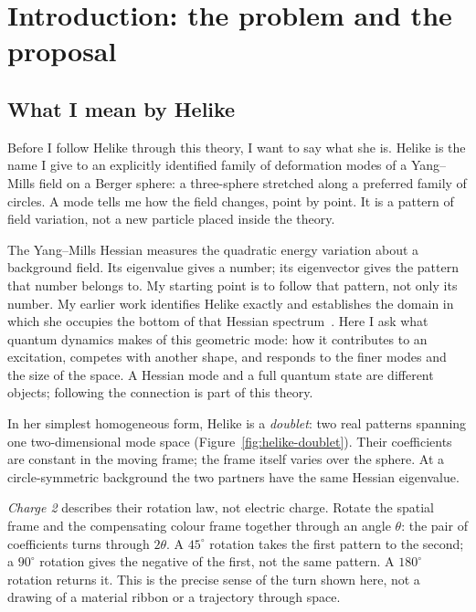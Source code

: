 \section{Introduction: the problem and the proposal}

\subsection*{What I mean by Helike}

Before I follow Helike through this theory, I want to say what she is. Helike is the name I give to an explicitly
identified family of deformation modes of a Yang--Mills field on a Berger sphere: a three-sphere stretched along a
preferred family of circles. A mode tells me how the field changes, point by point. It is a pattern of field
variation, not a new particle placed inside the theory.

The Yang--Mills Hessian measures the quadratic energy variation about a background field. Its eigenvalue gives
a number; its eigenvector gives the pattern that number belongs to. My starting point is to follow that pattern,
not only its number. My earlier work identifies Helike exactly and establishes the domain in which she occupies
the bottom of that Hessian spectrum~\cite{ByEnough,Floor}. Here I ask what quantum dynamics makes of this geometric
mode: how it contributes to an excitation, competes with another shape, and responds to the finer modes and the
size of the space. A Hessian mode and a full quantum state are different objects; following the connection is part
of this theory.

In her simplest homogeneous form, Helike is a \emph{doublet}: two real patterns spanning one two-dimensional mode
space (Figure~\ref{fig:helike-doublet}). Their coefficients are constant in the moving frame; the frame itself varies
over the sphere. At a circle-symmetric background the two partners have the same Hessian eigenvalue.

\par{}
\emph{Charge 2} describes their rotation law, not electric charge. Rotate the spatial frame and the compensating
colour frame together through an angle $\theta$: the pair of coefficients turns through $2\theta$. A $45^\circ$
rotation takes the first pattern to the second; a $90^\circ$ rotation gives the negative of the first, not the same
pattern. A $180^\circ$ rotation returns it. This is the precise sense of the turn shown here, not a drawing of a
material ribbon or a trajectory through space.

